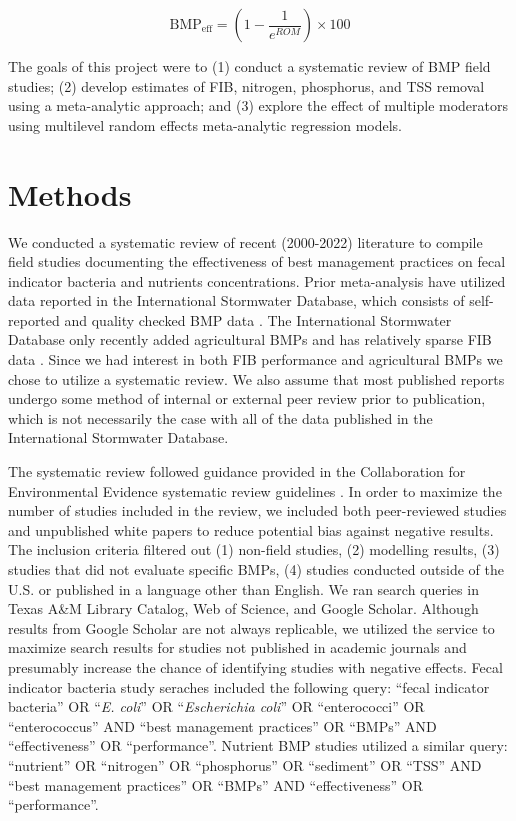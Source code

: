 \documentclass[utf8]{FrontiersinHarvard}
\begin{document}
\[
\text{BMP}_{\text{eff}} = \left( 1 - \frac{1}{e^{ROM}}\right) \times 100
\]

The goals of this project were to (1) conduct a systematic review of BMP field studies; (2) develop estimates of FIB, nitrogen, phosphorus, and TSS removal using a meta-analytic approach; and (3) explore the effect of multiple moderators using multilevel random effects meta-analytic regression models.

\hypertarget{methods}{%
\section{Methods}\label{methods}}

We conducted a systematic review of recent (2000-2022) literature to compile field studies documenting the effectiveness of best management practices on fecal indicator bacteria and nutrients concentrations.
Prior meta-analysis have utilized data reported in the International Stormwater Database, which consists of self-reported and quality checked BMP data \citep{claryBMPPerformanceAnalysis2011, kochNitrogenRemovalStormwater2014, horvathEffectsRegionalClimate2023}.
The International Stormwater Database only recently added agricultural BMPs and has relatively sparse FIB data \citep{claryBMPPerformanceAnalysis2011, kochNitrogenRemovalStormwater2014}.
Since we had interest in both FIB performance and agricultural BMPs we chose to utilize a systematic review.
We also assume that most published reports undergo some method of internal or external peer review prior to publication, which is not necessarily the case with all of the data published in the International Stormwater Database.

The systematic review followed guidance provided in the Collaboration for Environmental Evidence systematic review guidelines \citep{collaborationforenvironmentalevidenceGuidelinesStandardsEvidence2018}.
In order to maximize the number of studies included in the review, we included both peer-reviewed studies and unpublished white papers to reduce potential bias against negative results.
The inclusion criteria filtered out (1) non-field studies, (2) modelling results, (3) studies that did not evaluate specific BMPs, (4) studies conducted outside of the U.S. or published in a language other than English.
We ran search queries in Texas A\&M Library Catalog, Web of Science, and Google Scholar.
Although results from Google Scholar are not always replicable, we utilized the service to maximize search results for studies not published in academic journals and presumably increase the chance of identifying studies with negative effects.
Fecal indicator bacteria study seraches included the following query: ``fecal indicator bacteria'' OR ``\emph{E. coli}'' OR ``\emph{Escherichia coli}'' OR ``enterococci'' OR ``enterococcus'' AND ``best management practices'' OR ``BMPs'' AND ``effectiveness'' OR ``performance''. Nutrient BMP studies utilized a similar query: ``nutrient'' OR ``nitrogen'' OR ``phosphorus'' OR ``sediment'' OR ``TSS'' AND ``best management practices'' OR ``BMPs'' AND ``effectiveness'' OR ``performance''.
\end{document}
